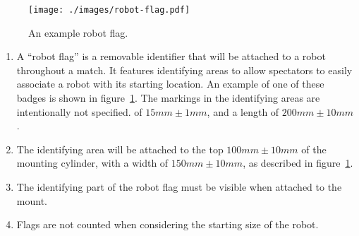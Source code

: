 \begin{figure}
  \centering
  \texttt{[image: ./images/robot-flag.pdf]}
  \caption{An example robot flag.}
  \label{fig:example-flag}
\end{figure}

\begin{enumerate}
  \item A ``robot flag'' is a removable identifier that will be attached to a robot throughout a match.
        It features identifying areas to allow spectators to easily associate a robot with its starting location.
        An example of one of these badges is shown in figure~\ref{fig:example-flag}.
        The markings in the identifying areas are intentionally not specified.
        of $15mm\pm1mm$, and a length of $200mm\pm10mm$.

  \item The identifying area will be attached to the top $100mm\pm10mm$ of the mounting cylinder,
        with a width of $150mm\pm10mm$, as described in figure~\ref{fig:example-flag}.

  \item The identifying part of the robot flag must be visible when attached to the mount.

  \item Flags are not counted when considering the starting size of the robot.
\end{enumerate}

